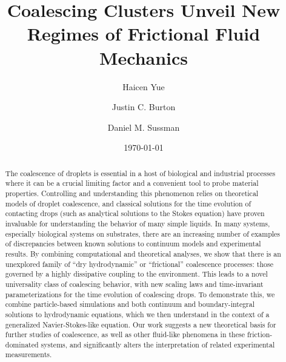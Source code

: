 \documentclass[%
reprint,
amsmath,amssymb,
aps,
]{revtex4-2}
\begin{document}
	\renewcommand{\arraystretch}{1.5}
	
	\title{Coalescing Clusters Unveil New Regimes of Frictional Fluid Mechanics}%
	
	\author{Haicen Yue}
        \author{Justin C. Burton}%
	\author{Daniel M. Sussman}
	
	
	
	\date{\today}%
	
	\begin{abstract}
		The coalescence of droplets is essential in a host of biological and industrial processes where it can be a crucial limiting factor and a convenient tool to probe material properties. Controlling and understanding this phenomenon relies on theoretical models of droplet coalescence, and classical solutions for the time evolution of contacting drops (such as analytical solutions to the Stokes equation) have proven invaluable for understanding the behavior of many simple liquids. In many systems, especially biological systems on substrates, there are an increasing number of examples of discrepancies between known solutions to continuum models and experimental results. By combining computational and theoretical analyses, we show that there is an unexplored family of ``dry hydrodynamic'' or ``frictional'' coalescence processes: those governed by a highly dissipative coupling to the environment. This leads to a novel universality class of coalescing behavior, with new scaling laws and time-invariant parameterizations for the time evolution of coalescing drops. To demonstrate this, we combine particle-based simulations and both continuum and boundary-integral solutions to hydrodynamic equations, which we then understand in the context of a generalized Navier-Stokes-like equation. Our work suggests a new theoretical basis for further studies of coalescence, as well as other fluid-like phenomena in these friction-dominated systems, and significantly alters the interpretation of related experimental measurements.
	\end{abstract}
	
\end{document}
